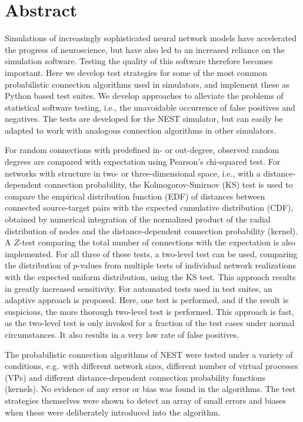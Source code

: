 
\chapter{Abstract}


Simulations of increasingly sophisticated neural network models have accelerated the progress of neuroscience, but have also led to an increased reliance on the simulation software. Testing the quality of this software therefore becomes important. Here we develop test strategies for some of the most common probabilistic connection algorithms used in simulators, and implement these as Python based test suites. We develop approaches to alleviate the problems of statistical software testing, i.e., the unavoidable occurrence of false positives and negatives. The tests are developed for the NEST simulator, but can easily be adapted to work with analogous connection algorithms in other simulators. 


For random connections with predefined in- or out-degree, observed random degrees are compared with expectation using Pearson's chi-squared test. For networks with structure in two- or three-dimensional space, i.e., with a distance-dependent connection probability, the Kolmogorov-Smirnov (KS) test is used to compare the empirical distribution function (EDF) of distances between connected source-target pairs with the expected cumulative distribution (CDF), obtained by numerical integration of the normalized product of the radial distribution of nodes and the distance-dependent connection probability (kernel). A $Z$-test comparing the total number of connections with the expectation is also implemented. For all three of these tests, a two-level test can be used, comparing the distribution of $p$-values from multiple tests of individual network realizations with the expected uniform distribution, using the KS test. This approach results in greatly increased sensitivity. For automated tests used in test suites, an adaptive approach is proposed. Here, one test is performed, and if the result is suspicious, the more thorough two-level test is performed. This approach is fast, as the two-level test is only invoked for a fraction of the test cases under normal circumstances. It also results in a very low rate of false positives.


The probabilistic connection algorithms of NEST were tested under a variety of conditions, e.g.~with different network sizes, different number of virtual processes (VPs) and different distance-dependent connection probability functions (kernels). No evidence of any error or bias was found in the algorithms. The test strategies themselves were shown to detect an array of small errors and biases when these were deliberately introduced into the algorithm. 




\clearchapter

